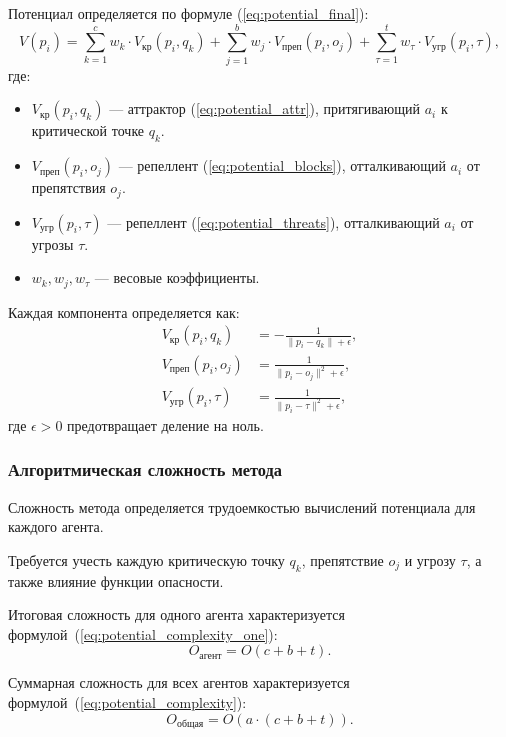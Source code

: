 Потенциал определяется по формуле (\ref{eq:potential_final}):
\begin{equation}
	\label{eq:potential_final}
	V(p_i) = \sum_{k=1}^{c} w_k \cdot V_{\text{кр}}(p_i, q_k) + \sum_{j=1}^{b} w_j \cdot V_{\text{преп}}(p_i, o_j) + \sum_{\tau=1}^{t} w_\tau \cdot V_{\text{угр}}(p_i, \tau),
\end{equation}
где:  
\begin{itemize}[leftmargin=1.6\parindent]
	\item $V_{\text{кр}}(p_i, q_k)$ — аттрактор (\ref{eq:potential_attr}), притягивающий $a_i$ к критической точке $q_k$.
	\item $V_{\text{преп}}(p_i, o_j)$ — репеллент (\ref{eq:potential_blocks}), отталкивающий $a_i$ от препятствия $o_j$.
	\item $V_{\text{угр}}(p_i, \tau)$ — репеллент (\ref{eq:potential_threats}), отталкивающий $a_i$ от угрозы $\tau$.
	\item $w_k, w_j, w_\tau$ — весовые коэффициенты.
\end{itemize}

Каждая компонента определяется как:
\begin{align}
	V_{\text{кр}}(p_i, q_k) &= -\frac{1}{\|p_i - q_k\| + \epsilon}, \label{eq:potential_attr} \\
	V_{\text{преп}}(p_i, o_j) &= \frac{1}{\|p_i - o_j\|^2 + \epsilon}, \label{eq:potential_blocks} \\
	V_{\text{угр}}(p_i, \tau) &= \frac{1}{\|p_i - \tau\|^2 + \epsilon}, \label{eq:potential_threat}
\end{align}
где $\epsilon > 0$ предотвращает деление на ноль.

\subsubsection*{Алгоритмическая сложность метода}
Сложность метода определяется трудоемкостью вычислений потенциала для каждого агента. 

Требуется учесть каждую критическую точку $q_k$, препятствие $o_j$ и угрозу $\tau$, а также влияние функции опасности.

Итоговая сложность для одного агента характеризуется формулой~(\ref{eq:potential_complexity_one}):
\begin{equation}
	\label{eq:potential_complexity_one}
	O_{\text{агент}} = O(c + b + t).
\end{equation}

Суммарная сложность для всех агентов характеризуется формулой~(\ref{eq:potential_complexity}):
\begin{equation}
	\label{eq:potential_complexity}
	O_{\text{общая}} = O(a \cdot (c + b + t)).
\end{equation}

